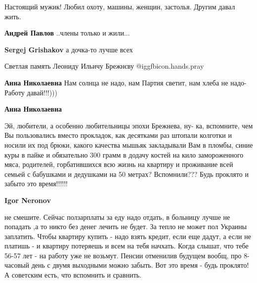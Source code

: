  
 
 
 
 
\zzSecCmt

\begin{itemize} %
Настоящий мужик! Любил охоту, машины, женщин, застолья. Другим давал жить.

\begin{itemize} %
\textbf{Андрей Павлов} ..члены только и жили...

\textbf{Sergej Grishakov} а дочка-то лучше всех
\end{itemize} %

Светлая память Леониду Ильичу Брежнєву  @igg{fbicon.hands.pray} 

\begin{itemize} %
\textbf{Анна Николаевна} Нам солнца не надо, нам Партия светит, нам хлеба не надо- Работу давай!!!)))

\textbf{Анна Николаевна} 

Эй, любители, а особенно любительницы эпохи Брежнева, ну- ка, вспомните, чем Вы
пользовались вместо прокладок, как десятками раз штопали колготки и носили их
под брюки, какого качества мышьяк закладывали Вам в пломбы, синие куры в пайке
и обязательно 300 грамм в додачу костей на кило замороженного мяса, родителей,
горбатившихся всю жизнь на квартиру и проживание всей семьей с бабушками и
дедушками на 50 метрах? Вспомнили??? Будь проклято и забыто это время!!!!!!

\begin{itemize} %
\textbf{Igor Neronov} 

не смешите. Сейчас ползарплаты за еду надо отдать, в больницу лучше не попадать
,а то никто без денег лечить не будет. За тепло не может пол Украины
заплатить. Чтобы квартиру купить - надо взять кредит, если еще дадут, а если не
платишь - и квартиру потеряешь и всем на тебя начхать. Когда слышат, что тебе
56-57 лет - на работу уже не возьмут. Пенсии отменилив будущем вообщ, про
8-часовый день с двумя выходными можно забыть. Вот это время - будь проклято! А
советским есть, что вспомнить и сравнить.



\end{itemize}
\end{itemize}
\end{itemize}
